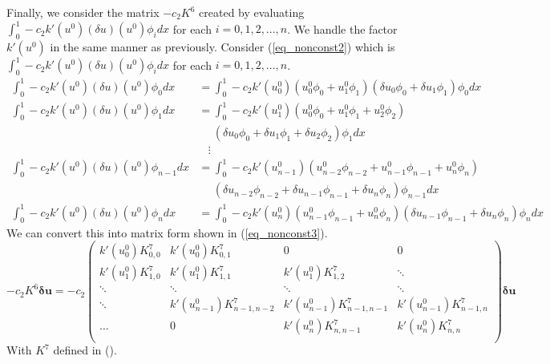 \documentclass[11pt,fleqn]{article}
\theoremstyle{defstyle}
\begin{document}
Finally, we consider the matrix $-c_2K^6$ created by evaluating $\int_0^1 -c_2 k\prime(u^0)(\delta u )(u^0) \phi_i dx$ for each $i=0,1,2,...,n$. We handle the factor $k\prime(u^0)$ in the same manner as previously. Consider (\ref{eq_nonconst2}) which is $\int_0^1 -c_2 k\prime(u^0)(\delta u )(u^0) \phi_i dx$ for each $i=0,1,2,...,n$.
\begin{equation}
\begin{aligned}
\int_0^1 -c_2 k\prime(u^0)(\delta u )(u^0) \phi_0 dx &= \int_0^1 -c_2 k\prime(u^0_0)\left(u^0_0\phi_0 + u^0_1\phi_1 \right) \left(\delta u_0\phi_0 + \delta u_1\phi_1 \right) \phi_0 dx  \\
\int_0^1 -c_2 k\prime(u^0)(\delta u )(u^0) \phi_1 dx &= \int_0^1 -c_2 k\prime(u^0_1)\left(u^0_0\phi_0 + u^0_1\phi_1 + u^0_2\phi_2\right) \\ &~~~~~~ \left(\delta u_0\phi_0 + \delta u_1\phi_1 + \delta u_2\phi_2\right) \phi_1 dx \\
&~~~~\vdots \\
\int_0^1 -c_2 k\prime(u^0)(\delta u )(u^0) \phi_{n-1} dx &= \int_0^1 -c_2 k\prime(u^0_{n-1})\left(u^0_{n-2}\phi_{n-2} + u^0_{n-1}\phi_{n-1} + u^0_n\phi_n\right) \\ &~~~~~~\left(\delta u_{n-2}\phi_{n-2} + \delta u_{n-1}\phi_{n-1} + \delta u_n\phi_n\right) \phi_{n-1} dx \\
\int_0^1 -c_2 k\prime(u^0)(\delta u )(u^0) \phi_n dx &= \int_0^1 -c_2 k\prime(u^0_n)\left(u^0_{n-1}\phi_{n-1} + u^0_n\phi_n\right) \left(\delta u_{n-1}\phi_{n-1} + \delta u_n\phi_n\right) \phi_n dx
\end{aligned}
\label{eq_nonconst2}
\end{equation}
We can convert this into matrix form shown in (\ref{eq_nonconst3}).
\begin{equation}
-c_2K^6\mathbf{\delta u} = -c_2\begin{pmatrix}
k\prime(u^0_0)K^7_{0,0} & k\prime(u^0_0)K^7_{0,1} & 0 & 0 \\
k\prime(u^0_1)K^7_{1,0} & k\prime(u^0_1)K^7_{1,1} & k\prime(u^0_1)K^7_{1,2} & \ddots \\
 \ddots & \ddots & \ddots & \ddots \\
 \ddots & k\prime(u^0_{n-1})K^7_{n-1,n-2} & k\prime(u^0_{n-1})K^7_{n-1,n-1} & k\prime(u^0_{n-1})K^7_{n-1,n} \\
 \hdots & 0 & k\prime(u^0_{n})K^7_{n,n-1} & k\prime(u^0_{n}) K^7_{n,n}\\
\end{pmatrix}\mathbf{\delta u}
\label{eq_nonconst3}
\end{equation}
With $K^7$ defined in ().
\end{document}
